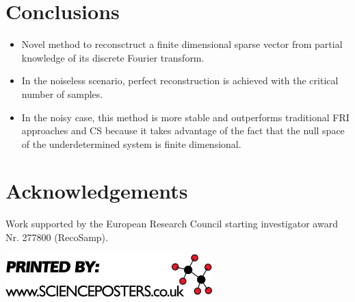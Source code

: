 \documentclass[a0,portrait]{a0poster}
\begin{document}
\begin{multicols}{2}

\section*{Conclusions}

\begin{itemize}

\item Novel method to reconsctruct a finite dimensional sparse vector from partial 
knowledge of its discrete Fourier transform. 

\item In the noiseless scenario, perfect reconstruction is achieved with the critical 
number of samples. 

\item In the noisy case, this method is more stable and outperforms traditional FRI approaches 
and CS because it takes advantage of the fact that the null space of the underdetermined 
system is finite dimensional.

\end{itemize}


\color{Navy}

\section*{Acknowledgements}

\small
Work supported by the European Research Council starting investigator award Nr. 277800 (RecoSamp).


\small
\nocite{*} %


\begin{flushright}
\vspace{1.1cm}
\includegraphics[width=8cm]{poster_logo}
\end{flushright}

\end{multicols}
\end{document}
